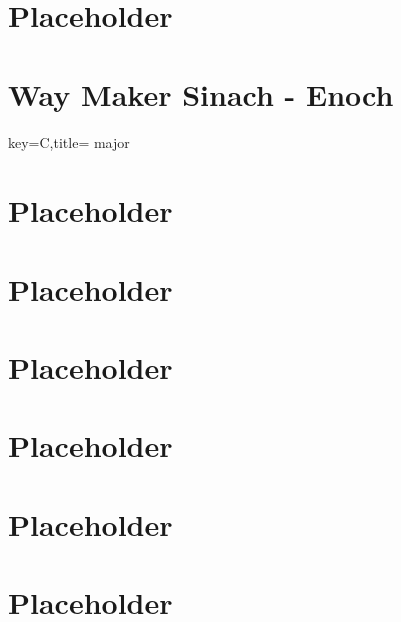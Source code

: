 \documentclass{article}
\begin{document}
\section{Placeholder} \pagebreak


%   

\newcommand{\NSsongC}[5]{
  \section{#5}
  \begin{song}[transpose=#1,enharmonic=#3]{key=#2,title={ major}}
    
  \end{song}
}

\NSsongC{0}{C}{sharp}{1107291445}{Way Maker Sinach - Enoch}

\section{Placeholder} \pagebreak
\section{Placeholder} \pagebreak
\section{Placeholder} \pagebreak

\section{Placeholder} \pagebreak
%   

\section{Placeholder} \pagebreak
\section{Placeholder} \pagebreak
\end{document}
